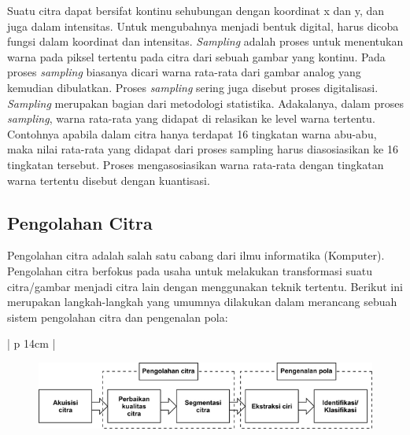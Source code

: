 Suatu citra dapat bersifat kontinu sehubungan dengan koordinat x dan y, dan juga dalam intensitas. Untuk mengubahnya menjadi bentuk digital, harus dicoba fungsi dalam koordinat dan intensitas. \textit{Sampling} adalah proses untuk menentukan warna pada piksel tertentu pada citra dari sebuah gambar yang kontinu. Pada proses \textit{sampling} biasanya dicari warna rata-rata dari gambar analog yang kemudian dibulatkan. Proses \textit{sampling} sering juga disebut proses digitalisasi. \textit{Sampling} merupakan bagian dari metodologi statistika. Adakalanya, dalam proses \textit{sampling}, warna rata-rata yang didapat di relasikan ke level warna tertentu. Contohnya apabila dalam citra hanya terdapat 16 tingkatan warna abu-abu, maka nilai rata-rata yang didapat dari proses sampling harus diasosiasikan ke 16 tingkatan tersebut. Proses mengasosiasikan warna rata-rata dengan tingkatan warna tertentu disebut dengan kuantisasi.
\\ 

\subsection{Pengolahan Citra}
Pengolahan citra adalah salah satu cabang dari ilmu informatika (Komputer). Pengolahan citra berfokus pada usaha untuk melakukan transformasi suatu citra/gambar menjadi citra lain dengan menggunakan teknik tertentu. Berikut ini merupakan langkah-langkah yang umumnya dilakukan dalam merancang sebuah sistem pengolahan citra dan pengenalan pola:

\begin{table}[H]
	\small
	\begin{adjustbox}{width=1\textwidth}
		\begin{tabular}{| p {14cm} |}
			\hline
			\begin{figure}[H]
				\centering
				\includegraphics[width=14cm]{images/pencit}
			\end{figure} \\
			\hline
		\end{tabular}
	\end{adjustbox}
	\label{img:pencit}
\end{table}

